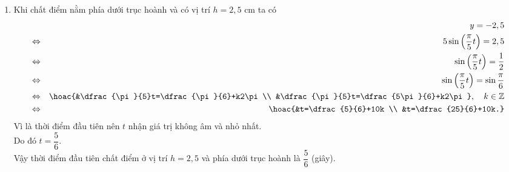 \begin{ex}
{\begin{enumerate}
			\centerline{$y=\big|y\big|=h=5 \Leftrightarrow a\sin\left(\dfrac{\pi}{5}\cdot\dfrac{5}{2}\right) =5  \Leftrightarrow a=5$.
			} 
			\item Khi chất điểm nằm phía dưới trục hoành và có vị trí $h=2{,}5$ cm  ta có
			\begin{eqnarray*}
				&&y=-2{,5} \\ 
				&\Leftrightarrow& 5\sin\left(\dfrac{\pi}{5}t\right)=2{,5}  \\
				&\Leftrightarrow&  \sin\left(\dfrac{\pi}{5}t\right)=\dfrac{1}{2} \\
				&\Leftrightarrow&  \sin\left(\dfrac{\pi}{5}t\right)=\sin\dfrac{\pi}{6} \\
				&\Leftrightarrow& \hoac{&\dfrac{\pi}{5}t=\dfrac{\pi}{6}+k2\pi \\ &\dfrac{\pi}{5}t=\dfrac{5\pi}{6}+k2\pi}, \quad k\in  \mathbb{Z} \\
				 &\Leftrightarrow& \hoac{&t=\dfrac{5}{6}+10k \\ &t=\dfrac{25}{6}+10k.}
			\end{eqnarray*}
			Vì là thời điểm đầu tiên nên $t$ nhận giá trị không âm và  nhỏ nhất. \\
			Do đó $t=\dfrac{5}{6}$.  \\
			Vậy thời điểm  đầu tiên chất điểm ở vị trí $h=2{,}5$ và phía dưới trục hoành là $\dfrac{5}{6}$ (giây).
		\end{enumerate}
	} 
\end{ex}

